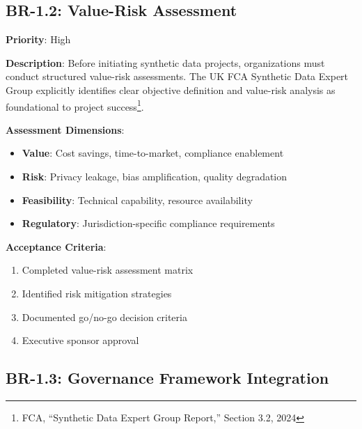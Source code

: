 \documentclass[12pt,a4paper,twoside]{report}
\begin{document}
\subsection{BR-1.2: Value-Risk Assessment}

\begin{tcolorbox}[colback=blue!5,colframe=blue!70,title=BR-1.2: Structured Value-Risk Assessment]
\textbf{Priority}: High

\textbf{Description}: Before initiating synthetic data projects, organizations
must conduct structured value-risk assessments. The UK FCA Synthetic Data Expert
Group explicitly identifies clear objective definition and value-risk analysis
as foundational to project success\footnote{FCA, ``Synthetic Data Expert Group
Report,'' Section 3.2, 2024}.

\textbf{Assessment Dimensions}:
\begin{itemize}
\item \textbf{Value}: Cost savings, time-to-market, compliance enablement
\item \textbf{Risk}: Privacy leakage, bias amplification, quality degradation
\item \textbf{Feasibility}: Technical capability, resource availability
\item \textbf{Regulatory}: Jurisdiction-specific compliance requirements
\end{itemize}

\textbf{Acceptance Criteria}:
\begin{enumerate}
\item Completed value-risk assessment matrix
\item Identified risk mitigation strategies
\item Documented go/no-go decision criteria
\item Executive sponsor approval
\end{enumerate}
\end{tcolorbox}

\subsection{BR-1.3: Governance Framework Integration}
\end{document}
